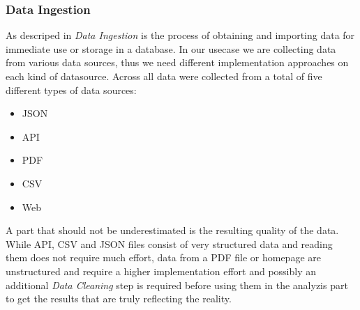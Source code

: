 \subsubsection{Data Ingestion}
\label{subsubsec:ingestion}
As descriped in\cite{ingestion} \textit{Data Ingestion} is the process of obtaining and importing data for immediate use or storage in a database.
In our usecase we are collecting data from various data sources, thus we need different implementation approaches on each kind of datasource.
\newline
Across all  data were collected from a total of five different types of data sources:
\begin{itemize}
  \item \ac{JSON}
  \item \ac{API}
  \item \ac{PDF}
  \item \ac{CSV}
  \item Web
\end{itemize}
A part that should not be underestimated is the resulting quality of the data.
While \ac{API}, \ac{CSV} and \ac{JSON} files consist of very structured data and reading them does not require much effort,
data from a \ac{PDF} file or homepage are unstructured and require a higher implementation effort and possibly an additional
\textit{Data Cleaning} step is required before using them in the analyzis part to get the results that are truly reflecting the reality.


%
